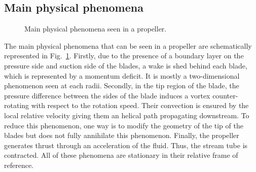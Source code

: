\subsection{Main physical phenomena}
\label{sub:cror_propeller_physics}

\begin{figure}
  \centering
  \quad{}
  \quad{}
  \caption{Main physical phenomena seen in a propeller.}
  \label{fig:propeller_phys_phenomena}
\end{figure}
The main physical phenomena that can be seen in a propeller are schematically represented
in Fig.~\ref{fig:propeller_phys_phenomena}. Firstly, due to the presence of a boundary
layer on the pressure side and suction side of the blades, a wake is shed behind each blade, which
is represented by a momentum deficit. It is mostly a two-dimensional
phenomenon seen at each radii. Secondly, in the tip region of the blade, the pressure difference between 
the sides of the blade induces a vortex counter-rotating with respect to 
the rotation speed. Their convection is ensured by the local relative velocity giving them
an helical path propagating downstream.
To reduce this phenomenon, one way is to modify the geometry of the tip
of the blades but does not fully annihilate this phenomenon. 
Finally, the propeller generates thrust through an acceleration of the fluid. Thus, the stream
tube is contracted. All of these phenomena are stationary in their relative frame of reference.

